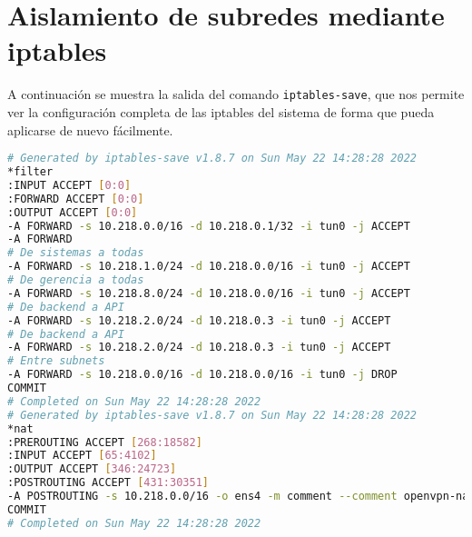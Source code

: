 \chapter{Aislamiento de subredes mediante iptables}
\label{anexo:iptables}

A continuación se muestra la salida del comando \texttt{iptables-save}, que nos permite ver la configuración completa de las iptables del sistema de forma que pueda aplicarse de nuevo fácilmente.

\begin{lstlisting}[language=Bash]
# Generated by iptables-save v1.8.7 on Sun May 22 14:28:28 2022
*filter
:INPUT ACCEPT [0:0]
:FORWARD ACCEPT [0:0]
:OUTPUT ACCEPT [0:0]
-A FORWARD -s 10.218.0.0/16 -d 10.218.0.1/32 -i tun0 -j ACCEPT
-A FORWARD
# De sistemas a todas
-A FORWARD -s 10.218.1.0/24 -d 10.218.0.0/16 -i tun0 -j ACCEPT
# De gerencia a todas
-A FORWARD -s 10.218.8.0/24 -d 10.218.0.0/16 -i tun0 -j ACCEPT
# De backend a API
-A FORWARD -s 10.218.2.0/24 -d 10.218.0.3 -i tun0 -j ACCEPT
# De backend a API
-A FORWARD -s 10.218.2.0/24 -d 10.218.0.3 -i tun0 -j ACCEPT
# Entre subnets
-A FORWARD -s 10.218.0.0/16 -d 10.218.0.0/16 -i tun0 -j DROP
COMMIT
# Completed on Sun May 22 14:28:28 2022
# Generated by iptables-save v1.8.7 on Sun May 22 14:28:28 2022
*nat
:PREROUTING ACCEPT [268:18582]
:INPUT ACCEPT [65:4102]
:OUTPUT ACCEPT [346:24723]
:POSTROUTING ACCEPT [431:30351]
-A POSTROUTING -s 10.218.0.0/16 -o ens4 -m comment --comment openvpn-nat-rule -j MASQUERADE
COMMIT
# Completed on Sun May 22 14:28:28 2022
\end{lstlisting}
